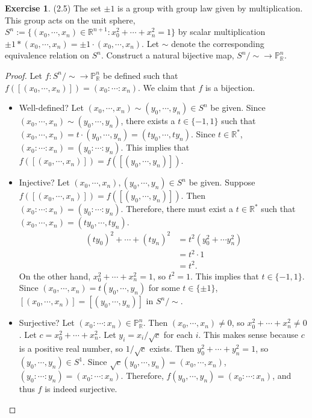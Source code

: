 \documentclass[12pt, psamsfonts]{amsart}
\theoremstyle{definition}
\newtheorem*{exer}{Exercise}
\theoremstyle{remark}
\numberwithin{equation}{section}
\begin{document}
\begin{exer}{(2.5)}
  The set $\pm 1$ is a group with group law given by multiplication.
  This group acts on the unit sphere, $S^n := \{ (x_0, \cdots, x_n) \in \mathbb{R}^{n + 1} : x_0^2 + \cdots + x_n^2 = 1 \}$ by scalar multiplication $\pm 1 * (x_0, \cdots, x_n) = \pm 1 \cdot (x_0, \cdots, x_n)$.
  Let $\sim$ denote the corresponding equivalence relation on $S^n$.
  Construct a natural bijective map, $S^n \slash \sim \rightarrow \mathbb{P}^n_{\mathbb{R}}$.
\end{exer}

\begin{proof}
  Let $f: S^n \slash \sim \rightarrow \mathbb{P}^n_{\mathbb{R}}$ be defined such that $f([(x_0, \cdots, x_n)]) = (x_0 : \cdots : x_n)$.
  We claim that $f$ is a bijection.
  \begin{itemize}
    \item
      Well-defined?
      Let $(x_0, \cdots, x_n) \sim (y_0, \cdots, y_n) \in S^n$ be given.
      Since $(x_0, \cdots, x_n) \sim (y_0, \cdots, y_n)$, there exists a $t \in \{ -1, 1 \}$ such that $(x_0, \cdots, x_n) = t \cdot (y_0, \cdots, y_n) = (ty_0, \cdots, ty_n)$.
      Since $t \in \mathbb{R}^*$, $(x_0 : \cdots : x_n) = (y_0 : \cdots : y_n)$.
      This implies that $f([(x_0, \cdots, x_n)]) = f([(y_0, \cdots, y_n)])$.
    \item
      Injective?
      Let $(x_0, \cdots, x_n), (y_0, \cdots, y_n) \in S^n$ be given.
      Suppose $f([(x_0, \cdots, x_n)]) = f([(y_0, \cdots, y_n)])$.
      Then $(x_0 : \cdots : x_n) = (y_0 : \cdots : y_n)$.
      Therefore, there must exist a $t \in \mathbb{R}^*$ such that $(x_0, \cdots, x_n) = (ty_0, \cdots, ty_n)$.
      \begin{align*}
        (ty_0)^2 + \cdots + (ty_n)^2
          &= t^2(y_0^2 + \cdots y_n^2) \\
          &= t^2 \cdot 1 \\
          &= t^2.
      \end{align*}
      On the other hand, $x_0^2 + \cdots + x_n^2 = 1$, so $t^2 = 1$.
      This implies that $t \in \{ -1, 1 \}$.
      Since $(x_0, \cdots, x_n) = t(y_0, \cdots, y_n)$ for some $t \in \{ \pm 1 \}$, $[(x_0, \cdots, x_n)] = [(y_0, \cdots, y_n)]$ in $S^n \slash \sim$.
    \item
      Surjective?
      Let $(x_0 : \cdots : x_n) \in \mathbb{P}^n_{\mathbb{R}}$.
      Then $(x_0, \cdots, x_n) \ne 0$, so $x_0^2 + \cdots + x_n^2 \ne 0$.
      Let $c = x_0^2 + \cdots + x_n^2$.
      Let $y_i = x_i / \sqrt{c}$ for each $i$.
      This makes sense because $c$ is a positive real number, so $1 / \sqrt{c}$ exists.
      Then $y_0^2 + \cdots + y_n^2 = 1$, so $(y_0, \cdots, y_n) \in S^1$.
      Since $\sqrt{c}(y_0, \cdots, y_n) = (x_0, \cdots, x_n)$, $(y_0 : \cdots : y_n) = (x_0 : \cdots : x_n)$.
      Therefore, $f(y_0, \cdots, y_n) = (x_0 : \cdots : x_n)$, and thus $f$ is indeed surjective.
  \end{itemize}

\end{proof}
\end{document}
